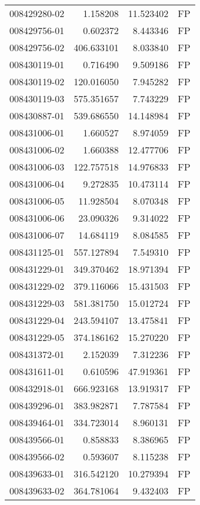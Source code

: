 \begin{tabular}{lrrl}
008429280-02 &    1.158208 &    11.523402 &   FP \\
008429756-01 &    0.602372 &     8.443346 &   FP \\
008429756-02 &  406.633101 &     8.033840 &   FP \\
008430119-01 &    0.716490 &     9.509186 &   FP \\
008430119-02 &  120.016050 &     7.945282 &   FP \\
008430119-03 &  575.351657 &     7.743229 &   FP \\
008430887-01 &  539.686550 &    14.148984 &   FP \\
008431006-01 &    1.660527 &     8.974059 &   FP \\
008431006-02 &    1.660388 &    12.477706 &   FP \\
008431006-03 &  122.757518 &    14.976833 &   FP \\
008431006-04 &    9.272835 &    10.473114 &   FP \\
008431006-05 &   11.928504 &     8.070348 &   FP \\
008431006-06 &   23.090326 &     9.314022 &   FP \\
008431006-07 &   14.684119 &     8.084585 &   FP \\
008431125-01 &  557.127894 &     7.549310 &   FP \\
008431229-01 &  349.370462 &    18.971394 &   FP \\
008431229-02 &  379.116066 &    15.431503 &   FP \\
008431229-03 &  581.381750 &    15.012724 &   FP \\
008431229-04 &  243.594107 &    13.475841 &   FP \\
008431229-05 &  374.186162 &    15.270220 &   FP \\
008431372-01 &    2.152039 &     7.312236 &   FP \\
008431611-01 &    0.610596 &    47.919361 &   FP \\
008432918-01 &  666.923168 &    13.919317 &   FP \\
008439296-01 &  383.982871 &     7.787584 &   FP \\
008439464-01 &  334.723014 &     8.960131 &   FP \\
008439566-01 &    0.858833 &     8.386965 &   FP \\
008439566-02 &    0.593607 &     8.115238 &   FP \\
008439633-01 &  316.542120 &    10.279394 &   FP \\
008439633-02 &  364.781064 &     9.432403 &   FP \\

\end{tabular}

